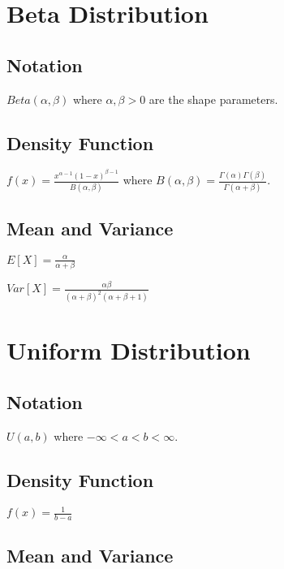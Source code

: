 \documentclass{article}
\begin{document}
\begin{multicols*}{2}

\section{Beta Distribution}
\label{sec:beta-dist}

\subsection{Notation}

$Beta(\alpha, \beta)$ where $\alpha,\beta > 0$ are the shape parameters.

\subsection{Density Function}

$f(x) = \frac{x^{\alpha - 1} (1 - x)^{\beta - 1}}{B(\alpha,\beta)}$ where $B(\alpha, \beta) = \frac{\Gamma(\alpha)\Gamma(\beta)}{\Gamma(\alpha + \beta)}$.

\subsection{Mean and Variance}

$E[X] = \frac{\alpha}{\alpha + \beta}$

$Var[X] = \frac{\alpha \beta}{(\alpha + \beta)^2(\alpha + \beta + 1)}$

\section{Uniform Distribution}
\label{sec:uniform-dist}

\subsection{Notation}

$U(a,b)$ where $-\infty < a < b < \infty$.

\subsection{Density Function}

$f(x) = \frac{1}{b - a}$

\subsection{Mean and Variance}


\end{multicols*}
\end{document}
